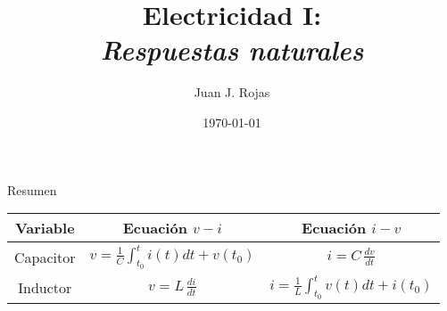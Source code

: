 \documentclass[aspectratio=169]{beamer}
\title{Electricidad I: \\ \emph{Respuestas naturales}}
\author{
    Juan J. Rojas
}
\institute{Instituto Tecnológico de Costa Rica}
\date{\today}
\begin{document}

\maketitle
\begin{frame}{Resumen}
    \begin{center}
        \begin{tabularx}{14cm}{C C C}
        \toprule
        Variable & Ecuación $v-i$ & Ecuación $i-v$ \\
        \midrule
       Capacitor & $v=\frac{1}{C}\int_{t_0}^{t} i(t)dt + v(t_0) $ & $i = C\,\frac{dv}{dt}$ \\[5pt]
        Inductor & $v = L\,\frac{di}{dt}$ & $i=\frac{1}{L}\int_{t_0}^{t} v(t)dt + i(t_0) $\\[5pt]
        \bottomrule
        \end{tabularx}   
    \end{center}
\end{frame}
\end{document}
